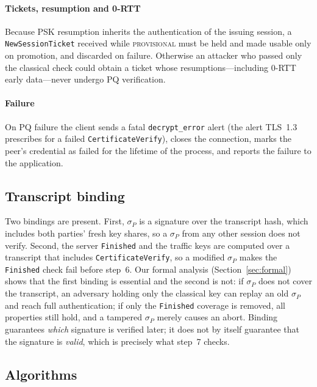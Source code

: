 \documentclass[preprint,10pt,3p]{elsarticle}
\newcommand{\state}[1]{\textsc{#1}}
\begin{document}
\paragraph{Tickets, resumption and 0-RTT}  Because PSK resumption inherits
the authentication of the issuing session, a \texttt{NewSessionTicket}
received while \state{provisional} must be held and made usable only on
promotion, and discarded on failure.  Otherwise an attacker who passed only
the classical check could obtain a ticket whose resumptions---including
0-RTT early data---never undergo PQ verification.

\paragraph{Failure}  On PQ failure the client sends a fatal
\texttt{decrypt\_error} alert (the alert TLS~1.3 prescribes for a failed
\texttt{CertificateVerify}), closes the connection, marks the peer's
credential as failed for the lifetime of the process, and reports the
failure to the application.

\subsection{Transcript binding}
\label{sec:binding}

Two bindings are present.  First, $\sigma_P$ is a signature over the
transcript hash, which includes both parties' fresh key shares, so a
$\sigma_P$ from any other session does not verify.  Second, the server
\texttt{Finished} and the traffic keys are computed over a transcript that
includes \texttt{CertificateVerify}, so a modified $\sigma_P$ makes the
\texttt{Finished} check fail before step~6.  Our formal analysis
(Section~\ref{sec:formal}) shows that the first binding is essential and
the second is not: if $\sigma_P$ does not cover the transcript, an
adversary holding only the classical key can replay an old $\sigma_P$ and
reach full authentication; if only the \texttt{Finished} coverage is
removed, all properties still hold, and a tampered $\sigma_P$ merely causes
an abort.  Binding guarantees \emph{which} signature is verified later; it
does not by itself guarantee that the signature is \emph{valid}, which is
precisely what step~7 checks.

\subsection{Algorithms}
\label{sec:algorithms}
\end{document}

